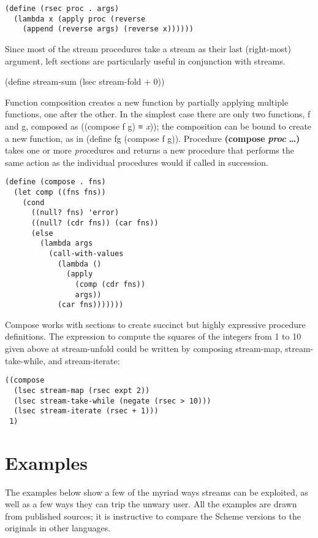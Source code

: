 \begin{verbatim}
(define (rsec proc . args)
  (lambda x (apply proc (reverse
    (append (reverse args) (reverse x))))))
\end{verbatim}

Since most of the stream procedures take a stream as their last
(right-most) argument, left sections are particularly useful in
conjunction with streams.

(define stream-sum (lsec stream-fold + 0))

Function composition creates a new function by partially applying
multiple functions, one after the other. In the simplest case there are
only two functions, f and g, composed as ((compose f g) ≡ \emph{x}));
the composition can be bound to create a new function, as in (define fg
(compose f g)). Procedure \textbf{(compose} \textbf{\emph{proc}}
\textbf{\ldots{})} takes one or more \emph{proc}edures and returns a new
procedure that performs the same action as the individual procedures
would if called in succession.

\begin{verbatim}
(define (compose . fns)
  (let comp ((fns fns))
    (cond
      ((null? fns) 'error)
      ((null? (cdr fns)) (car fns))
      (else
        (lambda args
          (call-with-values
            (lambda ()
              (apply
                (comp (cdr fns))
                args))
            (car fns)))))))
\end{verbatim}

Compose works with sections to create succinct but highly expressive
procedure definitions. The expression to compute the squares of the
integers from 1 to 10 given above at stream-unfold could be written by
composing stream-map, stream-take-while, and stream-iterate:

\begin{verbatim}
((compose
  (lsec stream-map (rsec expt 2))
  (lsec stream-take-while (negate (rsec > 10)))
  (lsec stream-iterate (rsec + 1)))
 1)
\end{verbatim}

\section{Examples}\label{examples}

The examples below show a few of the myriad ways streams can be
exploited, as well as a few ways they can trip the unwary user. All the
examples are drawn from published sources; it is instructive to compare
the Scheme versions to the originals in other languages.

